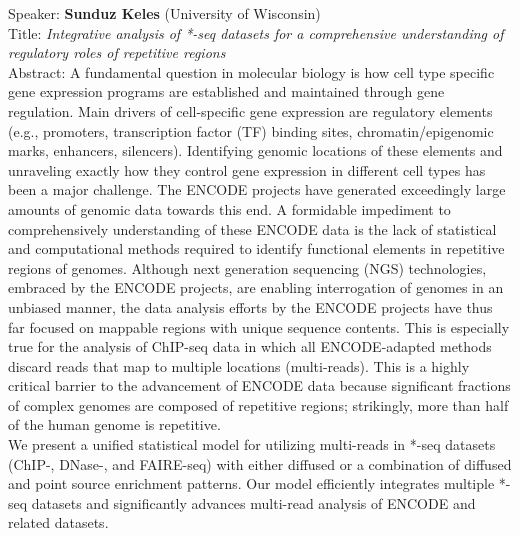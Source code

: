 \documentclass[11pt]{article}
\begin{document}
\bigskip
\noindent
Speaker: {\bf Sunduz Keles} (University of Wisconsin)\\
Title: {\it Integrative analysis of *-seq datasets for a comprehensive understanding of regulatory roles of repetitive regions}\\
Abstract: A fundamental question in molecular biology is how cell type
specific gene expression programs are established and maintained
through gene regulation. Main drivers of cell-specific gene expression
are regulatory elements (e.g., promoters, transcription factor (TF)
binding sites, chromatin/epigenomic marks, enhancers,
silencers). Identifying genomic locations of these elements and
unraveling exactly how they control gene expression in different cell
types has been a major challenge. The ENCODE projects have generated
exceedingly large amounts of genomic data towards this end. A
formidable impediment to comprehensively understanding of these ENCODE
data is the lack of statistical and computational methods required to
identify functional elements in repetitive regions of
genomes. Although next generation sequencing (NGS) technologies, embraced by the ENCODE projects, are enabling interrogation of genomes in an unbiased manner, the data analysis efforts by the ENCODE projects have thus far focused on mappable regions with unique sequence contents. This is especially true for the analysis of ChIP-seq data in which all ENCODE-adapted methods discard reads that map to multiple locations (multi-reads). This is a highly critical barrier to the advancement of ENCODE data because significant fractions of complex genomes are composed of repetitive regions; strikingly, more than half of the human genome is repetitive.\\


\noindent We present a unified statistical model for utilizing
multi-reads in *-seq datasets (ChIP-, DNase-, and FAIRE-seq) with
either diffused or a combination of diffused and point source
enrichment patterns. Our model efficiently integrates multiple *-seq
datasets and significantly advances multi-read analysis of ENCODE and
related datasets.
\end{document}
